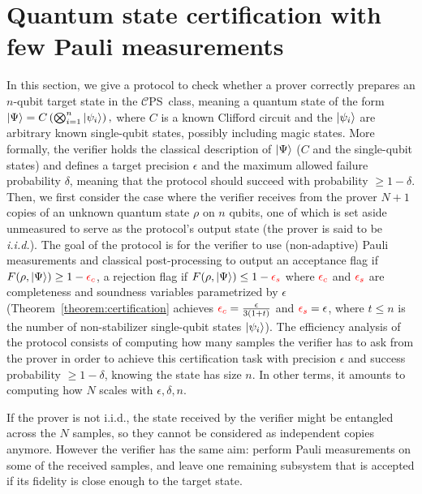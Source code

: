 \documentclass[a4paper,twocolumn,11pt,unpublished]{quantumarticle}
\newcommand{\CEPS}{$\mathcal C$PS}
\newif\ifhighlightchanges \highlightchangestrue
\newcommand{\revother}[1]{\ifhighlightchanges{\color{red}#1}\else#1\fi}
\begin{document}
\section{Quantum state certification with few Pauli measurements}
\label{section:certification}
In this section, we give a protocol to check whether a prover correctly prepares an $n$-qubit target state in the \CEPS\ class, meaning a quantum state of the form
        \(
        \ket{\Psi} = C\left(\bigotimes_{i=1}^n \ket{\psi_i}\right),
        \)
        where $C$ is a known Clifford circuit and the $\ket{\psi_i}$ are arbitrary known single-qubit states, possibly including magic states.
        More formally, 
%
%
the verifier holds the classical description of $\ket\Psi$ ($C$ and the single-qubit states) and defines a target precision $\epsilon$ and the maximum allowed failure probability $\delta$, meaning that the protocol should succeed with probability $\geq 1-\delta$. Then, we first consider the case where the verifier receives from the prover $N+1$ copies of an unknown quantum state $\rho$ on $n$ qubits, one of which is set aside unmeasured to serve as the protocol's output state (the prover is said to be \textit{i.i.d.}).
%
The goal of the protocol is for the verifier to use (non-adaptive) Pauli measurements and classical post-processing to output an acceptance flag if $F(\rho, \ket\Psi) \geq 1-\revother{\epsilon_c}$, a rejection flag if $F(\rho, \ket\Psi)\leq 1-\revother{\epsilon_s}$ where $\revother{\epsilon_c}$ and $\revother{\epsilon_s}$ are completeness and soundness variables parametrized by $\epsilon$ (Theorem~\ref{theorem:certification} achieves $\revother{\epsilon_c}=\frac{\epsilon}{3(1+t)}$ and $\revother{\epsilon_s}=\epsilon$, where $t\le n$ is the number of non-stabilizer single-qubit states $\ket{\psi_i}$).
The efficiency analysis of the protocol consists of computing how many samples the verifier has to ask from the prover in order to achieve this certification task with precision $\epsilon$ and success probability $\geq1-\delta$, knowing the state has size $n$. In other terms, it amounts to computing how $N$ scales with $\epsilon, \delta, n$.

If the prover is not i.i.d., the state received by the verifier might be entangled across the $N$ samples, so they cannot be considered as independent copies anymore. However the verifier has the same aim: perform Pauli measurements on some of the received samples, and leave one remaining subsystem that is accepted if its fidelity is close enough to the target state.
\end{document}
